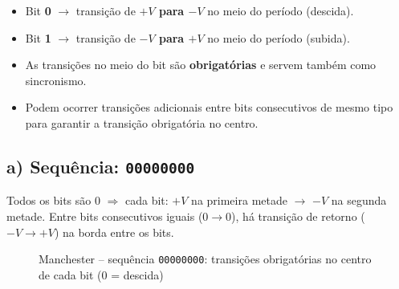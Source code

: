 \documentclass[12pt,a4paper]{article}
\begin{document}
\begin{itemize}
    \item Bit \textbf{0} $\rightarrow$ transição de \textbf{$+V$ para $-V$} no meio do período (descida).
    \item Bit \textbf{1} $\rightarrow$ transição de \textbf{$-V$ para $+V$} no meio do período (subida).
    \item As transições no meio do bit são \textbf{obrigatórias} e servem também como sincronismo.
    \item Podem ocorrer transições adicionais entre bits consecutivos de mesmo tipo para garantir a transição obrigatória no centro.
\end{itemize}

\subsection*{a) Sequência: \texttt{00000000}}

Todos os bits são 0 $\Rightarrow$ cada bit: $+V$ na primeira metade $\to$ $-V$ na segunda metade.
Entre bits consecutivos iguais (0$\to$0), há transição de retorno ($-V \to +V$) na borda entre os bits.

\begin{figure}[!htbp]
\centering
{}
\caption{Manchester -- sequência \texttt{00000000}: transições obrigatórias no centro de cada bit (0 = descida)}
\end{figure}
\end{document}
